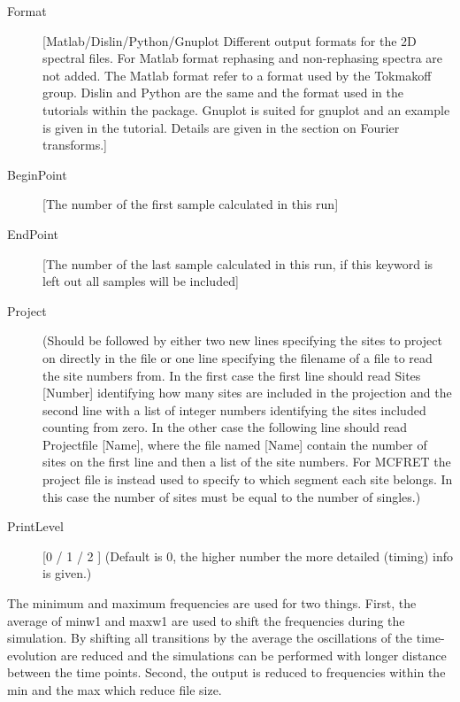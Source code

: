 \begin{description}
\item [Format] [Matlab/Dislin/Python/Gnuplot Different output formats for the 2D spectral files. For Matlab format rephasing and non-rephasing spectra are not added. The Matlab format refer to a format used by the Tokmakoff group. Dislin and Python are the same and the format used in the tutorials within the package. Gnuplot is suited for gnuplot and an example is given in the tutorial. Details are given in the section on Fourier transforms.] 
\item [BeginPoint] [The number of the first sample calculated in this run]
\item [EndPoint] [The number of the last sample calculated in this run, if this keyword is left out all samples will be included]
\item [Project] (Should be followed by either two new lines specifying the sites to project on directly in the file or one line specifying the filename of a file to read the site numbers from. In the first case the first line should read Sites [Number] identifying how many sites are included in the projection and the second line with a list of integer numbers identifying the sites included counting from zero. In the other case the following line should read Projectfile [Name], where the file named [Name] contain the number of sites on the first line and then a list of the site numbers. For MCFRET the project file is instead used to specify to which segment each site belongs. In this case the number of sites must be equal to the number of singles.)
\item [PrintLevel] [0 / 1 / 2 ] (Default is 0, the higher number the more detailed (timing) info is given.)
\end{description}

The minimum and maximum frequencies are used for two things. First, the average of minw1 and maxw1 are used to shift the frequencies during the simulation. By shifting all transitions by the
average the oscillations of the time-evolution are reduced and the simulations can be performed with
longer distance between the time points. Second, the output is reduced to frequencies within the
min and the max which reduce file size.

